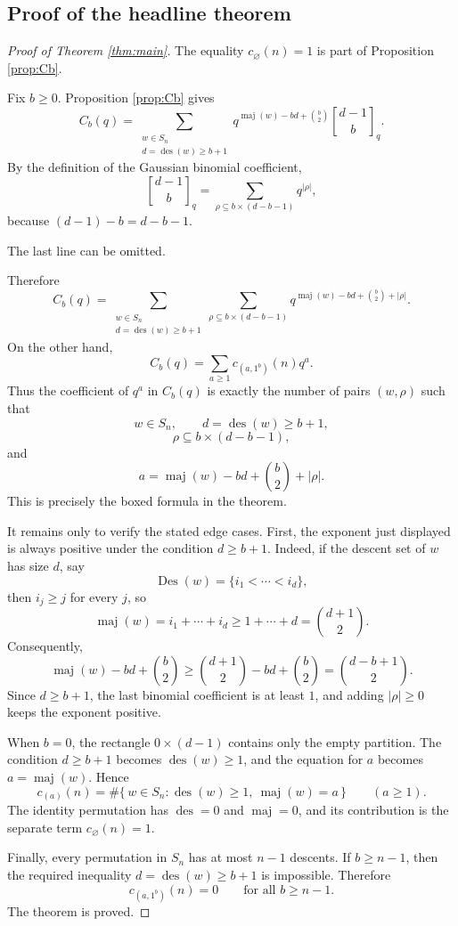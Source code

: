 \documentclass[12pt]{article}
\DeclareMathOperator{\Des}{Des}
\DeclareMathOperator{\des}{des}
\DeclareMathOperator{\maj}{maj}
\newcommand{\qbinom}[2]{\genfrac{[}{]}{0pt}{}{#1}{#2}_q}
\newcommand{\review}[1]{\begin{reviewbox}#1\end{reviewbox}}
\begin{document}
\subsection{Proof of the headline theorem}

\begin{proof}[Proof of Theorem \ref{thm:main}]
The equality \(c_{\varnothing}(n)=1\) is part of Proposition \ref{prop:Cb}.

Fix \(b\ge 0\).  Proposition \ref{prop:Cb} gives
\[
C_b(q)
=
\sum_{\substack{w\in S_n\\ d=\des(w)\ge b+1}}
q^{\maj(w)-bd+\binom{b}{2}}
\qbinom{d-1}{b}.
\]
By the definition of the Gaussian binomial coefficient,
\[
\qbinom{d-1}{b}
=
\sum_{\rho\subseteq b\times(d-b-1)}q^{|\rho|},
\]
because \((d-1)-b=d-b-1\).
\review{The last line can be omitted.}
Therefore
\[
C_b(q)
=
\sum_{\substack{w\in S_n\\ d=\des(w)\ge b+1}}
\sum_{\rho\subseteq b\times(d-b-1)}
q^{\maj(w)-bd+\binom{b}{2}+|\rho|}.
\]
On the other hand,
\[
C_b(q)=\sum_{a\ge 1}c_{(a,1^b)}(n)q^a.
\]
Thus the coefficient of \(q^a\) in \(C_b(q)\) is exactly the number of pairs \((w,\rho)\) such that
\[
w\in S_n,\qquad d=\des(w)\ge b+1,
\]
\[
\rho\subseteq b\times(d-b-1),
\]
and
\[
a=\maj(w)-bd+\binom{b}{2}+|\rho|.
\]
This is precisely the boxed formula in the theorem.

It remains only to verify the stated edge cases.  First, the exponent just displayed is always positive under the condition \(d\ge b+1\).  Indeed, if the descent set of \(w\) has size \(d\), say
\[
\Des(w)=\{i_1<\cdots<i_d\},
\]
then \(i_j\ge j\) for every \(j\), so
\[
\maj(w)=i_1+\cdots+i_d\ge 1+\cdots+d=\binom{d+1}{2}.
\]
Consequently,
\[
\maj(w)-bd+\binom{b}{2}
\ge
\binom{d+1}{2}-bd+\binom{b}{2}
=
\binom{d-b+1}{2}.
\]
Since \(d\ge b+1\), the last binomial coefficient is at least \(1\), and adding \(|\rho|\ge 0\) keeps the exponent positive.

When \(b=0\), the rectangle \(0\times(d-1)\) contains only the empty partition.  The condition \(d\ge b+1\) becomes \(\des(w)\ge 1\), and the equation for \(a\) becomes \(a=\maj(w)\).  Hence
\[
c_{(a)}(n)
=
\#\{\,w\in S_n:\des(w)\ge 1,\ \maj(w)=a\,\}
\qquad (a\ge 1).
\]
The identity permutation has \(\des=0\) and \(\maj=0\), and its contribution is the separate term \(c_{\varnothing}(n)=1\).

Finally, every permutation in \(S_n\) has at most \(n-1\) descents.  If \(b\ge n-1\), then the required inequality \(d=\des(w)\ge b+1\) is impossible.  Therefore
\[
c_{(a,1^b)}(n)=0
\qquad\text{for all }b\ge n-1.
\]
The theorem is proved.
\end{proof}
\end{document}
